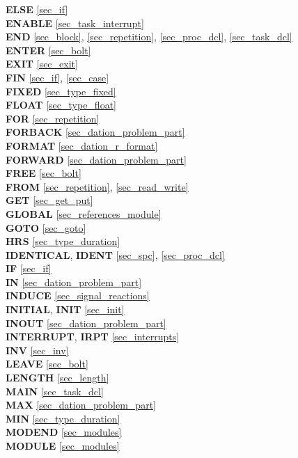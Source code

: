 {{\bf ELSE} \ref{sec_if}\\
{\bf ENABLE} \ref{sec_task_interrupt}\\
{\bf END} \ref{sec_block}, \ref{sec_repetition}, \ref{sec_proc_dcl},
	 \ref{sec_task_dcl}\\
{\bf ENTER} \ref{sec_bolt}\\
{\bf EXIT} \ref{sec_exit}\\

{\bf FIN} \ref{sec_if}, \ref{sec_case}\\
{\bf FIXED} \ref{sec_type_fixed}\\
{\bf FLOAT} \ref{sec_type_float}\\
{\bf FOR} \ref{sec_repetition}\\
{\bf FORBACK} \ref{sec_dation_problem_part}\\
{\bf FORMAT} \ref{sec_dation_r_format}\\
{\bf FORWARD} \ref{sec_dation_problem_part}\\
{\bf FREE} \ref{sec_bolt}\\
{\bf FROM} \ref{sec_repetition}, \ref{sec_read_write}\\
 
{\bf GET} \ref{sec_get_put}\\
{\bf GLOBAL} \ref{sec_references_module}\\
{\bf GOTO} \ref{sec_goto}\\
 
{\bf HRS} \ref{sec_type_duration}\\
 
{\bf IDENTICAL}, {\bf IDENT} \ref{sec_spc}, \ref{sec_proc_dcl}\\
{\bf IF} \ref{sec_if}\\                           
{\bf IN} \ref{sec_dation_problem_part}\\
{\bf INDUCE} \ref{sec_signal_reactions}\\
{\bf INITIAL}, {\bf INIT} \ref{sec_init}\\
{\bf INOUT} \ref{sec_dation_problem_part}\\
{\bf INTERRUPT}, {\bf IRPT} \ref{sec_interrupts}\\
{\bf INV} \ref{sec_inv}\\
 
{\bf LEAVE} \ref{sec_bolt}\\
{\bf LENGTH} \ref{sec_length}\\
 
{\bf MAIN} \ref{sec_task_dcl}\\
{\bf MAX} \ref{sec_dation_problem_part}\\
{\bf MIN} \ref{sec_type_duration}\\
{\bf MODEND} \ref{sec_modules}\\
{\bf MODULE} \ref{sec_modules}\\
 
}
